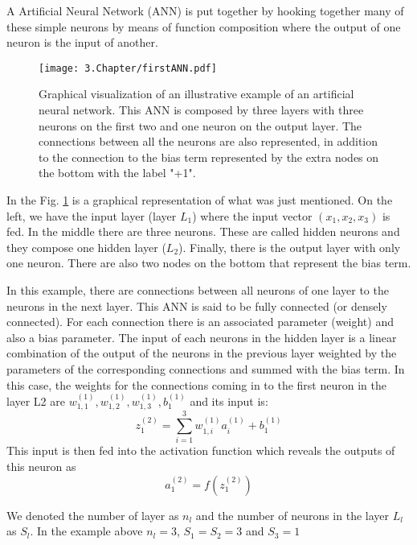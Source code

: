 A Artificial Neural Network (ANN) is put together by hooking together many of these simple neurons by means of function composition where the output of one neuron is the input of another.


\begin{figure}[!h]
	\centering
	\texttt{[image: 3.Chapter/firstANN.pdf]}
	\caption{Graphical visualization of an illustrative example of an artificial neural network. This ANN is composed by three layers with three neurons on the first two and one neuron on the output layer. The connections between all the neurons are also represented, in addition to the connection to the bias term represented by the extra nodes on the bottom with the label "+1".
}
\label{fig:first-ANN}
\end{figure}
In the Fig. \ref{fig:first-ANN} is a graphical representation of what was just mentioned. On the left, we have the input layer (layer $L_1$) where the input vector $(x_1,x_2,x_3)$ is fed. In the middle there are three neurons. These are called hidden neurons and they compose one hidden layer ($L_2$). Finally, there is the output layer with only one neuron. There are also two nodes on the bottom that represent the bias term.

In this example, there are connections between all neurons of one layer to the neurons in the next layer. This ANN is said to be fully connected (or densely connected). For each connection there is an associated parameter (weight) and also a bias parameter. The input of each neurons in the hidden layer is a linear combination of the output of the neurons in the previous layer weighted by the parameters of the corresponding connections and summed with the bias term. In this case, the weights for the connections coming in to the first neuron in the layer L2 are $w_{1,1}^{(1)},w_{1,2}^{(1)},w_{1,3}^{(1)}, b_1^{( 1 )}$ and its input is:
\begin{equation}
z_1^{(2)} = \sum_{i=1}^3 w_{1,i}^{(1)} a_i^{(1)} + b_1^{(1)}
\end{equation}
This input is then fed into the activation function which reveals the outputs of this neuron as 
\begin{equation}
a_1^{( 2 )} = f\left( z_1^{(2)} \right)
\end{equation}

We denoted the number of layer as $n_l$ and the number of neurons in the layer $L_l$ as $S_l$. In the example above $n_l=3$, $S_1 = S_2 = 3$ and $S_3 = 1$

